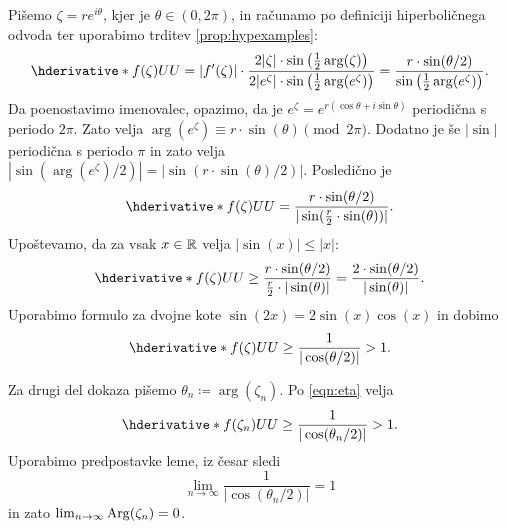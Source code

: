 \begin{dokaz}
    Pišemo \(\zeta = r e^{i \theta}\), kjer je \(\theta \in (0, 2 \pi)\), in računamo po definiciji hiperboličnega odvoda ter uporabimo trditev \ref{prop:hypexamples}:
    \[
        \hder{f (\zeta)}{U}{U}
        =
        |f' (\zeta)| \cdot \frac{2 |\zeta| \cdot \sin \prt{\frac{1}{2} \arg (\zeta)}}{2 |e^{\zeta}| \cdot \sin \prt{\frac{1}{2} \arg (e^{\zeta})}}
        =
        \frac{r \cdot \sin (\theta / 2)}{\sin \prt{\frac{1}{2} \arg (e^{\zeta})}}.
    \]
    Da poenostavimo imenovalec, opazimo, da je \(e^{\zeta} = e^{r (\cos \theta + i \sin \theta)}\) periodična s periodo \(2 \pi\). Zato velja \(\arg (e^{\zeta}) \equiv r \cdot \sin (\theta) \pmod{2 \pi}\). Dodatno je še \(|\sin|\) periodična s periodo \(\pi\) in zato velja \(|\sin (\arg (e^{\zeta}) / 2)| = |\sin (r \cdot \sin (\theta) / 2)|\). Posledično je
    \[\hder{f (\zeta)}{U}{U} = \frac{r \cdot \sin (\theta / 2)}{|\sin (\frac{r}{2} \cdot \sin (\theta))|}.\]
    Upoštevamo, da za vsak \(x \in \mathbb R\) velja \(|\sin (x)| \leq |x|\):
    \[\hder{f (\zeta)}{U}{U} \geq \frac{r \cdot \sin (\theta / 2)}{\frac{r}{2} \cdot |\sin (\theta)|} = \frac{2 \cdot \sin (\theta / 2)}{|\sin (\theta)|}.\]
    Uporabimo formulo za dvojne kote \(\sin (2 x) = 2 \sin (x) \cos (x)\) in dobimo
    \begin{equation} \label{eqn:eta}
        \hder{f (\zeta)}{U}{U} \geq \frac{1}{|\cos (\theta / 2)|} > 1.
    \end{equation}

    \noindent Za drugi del dokaza pišemo \(\theta_n \coloneq \arg (\zeta_n)\). Po \eqref{eqn:eta} velja
    \[\hder{f (\zeta_n)}{U}{U} \geq \frac{1}{|\cos (\theta_n / 2)|} > 1.\]
    Uporabimo predpostavke leme, iz česar sledi
    \[\lim_{n \to \infty} \frac{1}{|\cos (\theta_n / 2)|} = 1\]
    in zato \(\lim_{n \to \infty} \operatorname{Arg} (\zeta_n) = 0\).
\end{dokaz}



